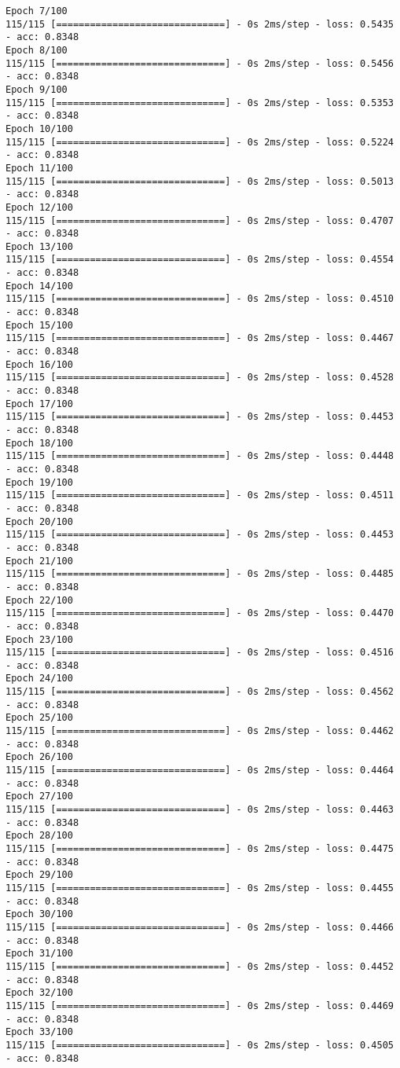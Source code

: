\documentclass[11pt]{article}
\begin{document}
\begin{Verbatim}[commandchars=\\\{\}]
Epoch 7/100
115/115 [==============================] - 0s 2ms/step - loss: 0.5435 - acc: 0.8348
Epoch 8/100
115/115 [==============================] - 0s 2ms/step - loss: 0.5456 - acc: 0.8348
Epoch 9/100
115/115 [==============================] - 0s 2ms/step - loss: 0.5353 - acc: 0.8348
Epoch 10/100
115/115 [==============================] - 0s 2ms/step - loss: 0.5224 - acc: 0.8348
Epoch 11/100
115/115 [==============================] - 0s 2ms/step - loss: 0.5013 - acc: 0.8348
Epoch 12/100
115/115 [==============================] - 0s 2ms/step - loss: 0.4707 - acc: 0.8348
Epoch 13/100
115/115 [==============================] - 0s 2ms/step - loss: 0.4554 - acc: 0.8348
Epoch 14/100
115/115 [==============================] - 0s 2ms/step - loss: 0.4510 - acc: 0.8348
Epoch 15/100
115/115 [==============================] - 0s 2ms/step - loss: 0.4467 - acc: 0.8348
Epoch 16/100
115/115 [==============================] - 0s 2ms/step - loss: 0.4528 - acc: 0.8348
Epoch 17/100
115/115 [==============================] - 0s 2ms/step - loss: 0.4453 - acc: 0.8348
Epoch 18/100
115/115 [==============================] - 0s 2ms/step - loss: 0.4448 - acc: 0.8348
Epoch 19/100
115/115 [==============================] - 0s 2ms/step - loss: 0.4511 - acc: 0.8348
Epoch 20/100
115/115 [==============================] - 0s 2ms/step - loss: 0.4453 - acc: 0.8348
Epoch 21/100
115/115 [==============================] - 0s 2ms/step - loss: 0.4485 - acc: 0.8348
Epoch 22/100
115/115 [==============================] - 0s 2ms/step - loss: 0.4470 - acc: 0.8348
Epoch 23/100
115/115 [==============================] - 0s 2ms/step - loss: 0.4516 - acc: 0.8348
Epoch 24/100
115/115 [==============================] - 0s 2ms/step - loss: 0.4562 - acc: 0.8348
Epoch 25/100
115/115 [==============================] - 0s 2ms/step - loss: 0.4462 - acc: 0.8348
Epoch 26/100
115/115 [==============================] - 0s 2ms/step - loss: 0.4464 - acc: 0.8348
Epoch 27/100
115/115 [==============================] - 0s 2ms/step - loss: 0.4463 - acc: 0.8348
Epoch 28/100
115/115 [==============================] - 0s 2ms/step - loss: 0.4475 - acc: 0.8348
Epoch 29/100
115/115 [==============================] - 0s 2ms/step - loss: 0.4455 - acc: 0.8348
Epoch 30/100
115/115 [==============================] - 0s 2ms/step - loss: 0.4466 - acc: 0.8348
Epoch 31/100
115/115 [==============================] - 0s 2ms/step - loss: 0.4452 - acc: 0.8348
Epoch 32/100
115/115 [==============================] - 0s 2ms/step - loss: 0.4469 - acc: 0.8348
Epoch 33/100
115/115 [==============================] - 0s 2ms/step - loss: 0.4505 - acc: 0.8348

\end{Verbatim}
\end{document}
